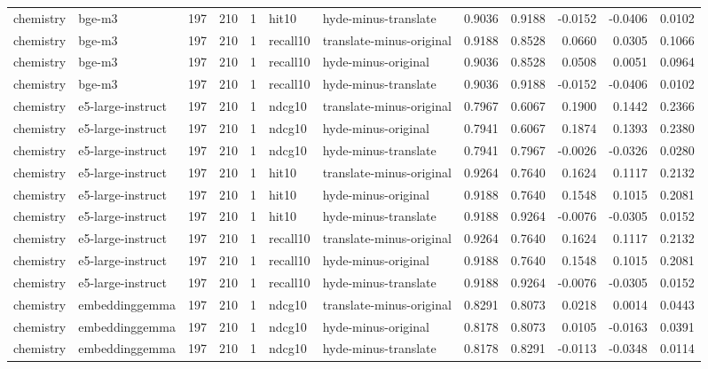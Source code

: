 \begin{tabular}{llrrrllrrrrr}
chemistry & bge-m3 & 197 & 210 & 1 & hit10 & hyde-minus-translate & 0.9036 & 0.9188 & -0.0152 & -0.0406 & 0.0102 \\
chemistry & bge-m3 & 197 & 210 & 1 & recall10 & translate-minus-original & 0.9188 & 0.8528 & 0.0660 & 0.0305 & 0.1066 \\
chemistry & bge-m3 & 197 & 210 & 1 & recall10 & hyde-minus-original & 0.9036 & 0.8528 & 0.0508 & 0.0051 & 0.0964 \\
chemistry & bge-m3 & 197 & 210 & 1 & recall10 & hyde-minus-translate & 0.9036 & 0.9188 & -0.0152 & -0.0406 & 0.0102 \\
chemistry & e5-large-instruct & 197 & 210 & 1 & ndcg10 & translate-minus-original & 0.7967 & 0.6067 & 0.1900 & 0.1442 & 0.2366 \\
chemistry & e5-large-instruct & 197 & 210 & 1 & ndcg10 & hyde-minus-original & 0.7941 & 0.6067 & 0.1874 & 0.1393 & 0.2380 \\
chemistry & e5-large-instruct & 197 & 210 & 1 & ndcg10 & hyde-minus-translate & 0.7941 & 0.7967 & -0.0026 & -0.0326 & 0.0280 \\
chemistry & e5-large-instruct & 197 & 210 & 1 & hit10 & translate-minus-original & 0.9264 & 0.7640 & 0.1624 & 0.1117 & 0.2132 \\
chemistry & e5-large-instruct & 197 & 210 & 1 & hit10 & hyde-minus-original & 0.9188 & 0.7640 & 0.1548 & 0.1015 & 0.2081 \\
chemistry & e5-large-instruct & 197 & 210 & 1 & hit10 & hyde-minus-translate & 0.9188 & 0.9264 & -0.0076 & -0.0305 & 0.0152 \\
chemistry & e5-large-instruct & 197 & 210 & 1 & recall10 & translate-minus-original & 0.9264 & 0.7640 & 0.1624 & 0.1117 & 0.2132 \\
chemistry & e5-large-instruct & 197 & 210 & 1 & recall10 & hyde-minus-original & 0.9188 & 0.7640 & 0.1548 & 0.1015 & 0.2081 \\
chemistry & e5-large-instruct & 197 & 210 & 1 & recall10 & hyde-minus-translate & 0.9188 & 0.9264 & -0.0076 & -0.0305 & 0.0152 \\
chemistry & embeddinggemma & 197 & 210 & 1 & ndcg10 & translate-minus-original & 0.8291 & 0.8073 & 0.0218 & 0.0014 & 0.0443 \\
chemistry & embeddinggemma & 197 & 210 & 1 & ndcg10 & hyde-minus-original & 0.8178 & 0.8073 & 0.0105 & -0.0163 & 0.0391 \\
chemistry & embeddinggemma & 197 & 210 & 1 & ndcg10 & hyde-minus-translate & 0.8178 & 0.8291 & -0.0113 & -0.0348 & 0.0114 \\

\end{tabular}
